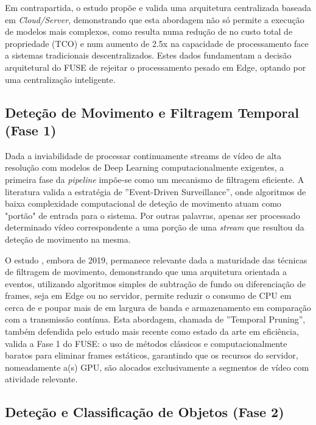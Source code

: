 Em contrapartida, o estudo \cite{lu_real-time_2025} propõe e valida uma arquitetura centralizada baseada em \textit{Cloud/Server}, demonstrando que esta abordagem não só permite a execução de modelos mais complexos, como resulta numa redução de  no custo total de propriedade (\gls{TCO}) e num aumento de 2.5x na capacidade de processamento face a sistemas tradicionais descentralizados. Estes dados fundamentam a decisão arquitetural do \gls{FUSE} de rejeitar o processamento pesado em Edge, optando por uma centralização inteligente.

\subsection{Deteção de Movimento e Filtragem Temporal (Fase 1)}
\label{subsec:deteção_movimento}

Dada a inviabilidade de processar continuamente streams de vídeo de alta resolução com modelos de Deep Learning computacionalmente exigentes, a primeira fase da \textit{pipeline} impõe-se como um mecanismo de filtragem eficiente. A literatura valida a estratégia de ''Event-Driven Surveillance'', onde algoritmos de baixa complexidade computacional de deteção de movimento atuam como "portão" de entrada para o sistema. Por outras palavras, apenas ser processado determinado vídeo correspondente a uma porção de uma \textit{stream} que resultou da deteção de movimento na mesma.

O estudo \cite{sultana_iot-guard_2019}, embora de 2019, permanece relevante dada a maturidade das técnicas de filtragem de movimento, demonstrando que uma arquitetura orientada a eventos, utilizando algoritmos simples de subtração de fundo ou diferenciação de frames, seja em Edge ou no servidor, permite reduzir o consumo de \gls{CPU} em cerca de  e poupar mais de  em largura de banda e armazenamento em comparação com a transmissão contínua. Esta abordagem, chamada de ''Temporal Pruning'', também defendida pelo estudo mais recente \cite{bai_decade_2025} como estado da arte em eficiência, valida a Fase 1 do \gls{FUSE}: o uso de métodos clássicos e computacionalmente baratos para eliminar frames estáticos, garantindo que os recursos do servidor, nomeadamente a(s) \gls{GPU}, são alocados exclusivamente a segmentos de vídeo com atividade relevante.

\subsection{Deteção e Classificação de Objetos (Fase 2)}
\label{subsec:deteção_objetos}

